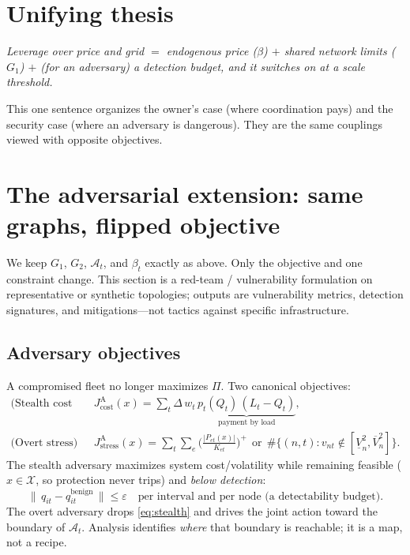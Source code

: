 \documentclass[11pt]{article}
\newcommand{\X}{\mathcal X}
\newcommand{\adv}{\mathrm{A}}
\begin{document}
\section{Unifying thesis}

\begin{center}
\emph{Leverage over price and grid $=$ endogenous price ($\beta$) $+$ shared
network limits ($G_1$) $+$ (for an adversary) a detection budget, and it
switches on at a scale threshold.}
\end{center}
This one sentence organizes the owner's case (where coordination pays) and the
security case (where an adversary is dangerous). They are the same couplings
viewed with opposite objectives.

\section{The adversarial extension: same graphs, flipped objective}
\label{sec:adv}

We keep $G_1$, $G_2$, $\mathcal A_t$, and $\beta_t$ exactly as above. Only the
objective and one constraint change. This section is a red-team / vulnerability
formulation on representative or synthetic topologies; outputs are vulnerability
metrics, detection signatures, and mitigations---not tactics against specific
infrastructure.

\subsection{Adversary objectives}
A compromised fleet no longer maximizes $\Pi$. Two canonical objectives:
\begin{align}
\text{(Stealth cost inflation)}\quad
& J^{\adv}_{\text{cost}}(x)=\sum_t\Delta\,w_t\,\underbrace{p_t(Q_t)\,(L_t-Q_t)}_{\text{payment by load}},\\
\text{(Overt stress)}\quad
& J^{\adv}_{\text{stress}}(x)=\sum_t\sum_{e}\Big(\tfrac{|P_{et}(x)|}{K_{et}}\Big)^{+}
\ \ \text{or}\ \ \#\{(n,t):v_{nt}\notin[\underline V_n^2,\overline V_n^2]\}.
\end{align}
The stealth adversary maximizes system cost/volatility while remaining feasible
($x\in\X$, so protection never trips) and \emph{below detection}:
\begin{equation}
\big\|\,q_{it}-q_{it}^{\text{benign}}\,\big\|\le \varepsilon
\quad\text{per interval and per node (a detectability budget).}
\label{eq:stealth}
\end{equation}
The overt adversary drops \eqref{eq:stealth} and drives the joint action toward
the boundary of $\mathcal A_t$. Analysis identifies \emph{where} that boundary
is reachable; it is a map, not a recipe.
\end{document}
